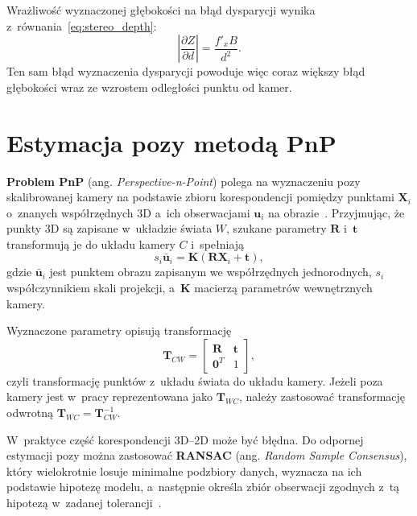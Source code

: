 Wrażliwość wyznaczonej głębokości na błąd dysparycji wynika z~równania~\eqref{eq:stereo_depth}:
\begin{equation}
\left|
\frac{\partial Z}{\partial d}
\right|
=
\frac{f'_x B}{d^2}.
\label{eq:depth_sensitivity}
\end{equation}
Ten sam błąd wyznaczenia dysparycji powoduje więc coraz większy błąd głębokości wraz ze wzrostem odległości punktu od kamer.


\section{Estymacja pozy metodą PnP}
\label{sec:estymacja_pnp}
\label{subsec:pnp}

\textbf{Problem PnP} (ang. \textit{Perspective-n-Point}) polega na wyznaczeniu pozy skalibrowanej kamery na podstawie zbioru korespondencji pomiędzy punktami $\mathbf{X}_i$ o~znanych współrzędnych 3D a~ich obserwacjami $\mathbf{u}_i$ na obrazie~\cite{lepetit2009epnp}. Przyjmując, że punkty 3D są zapisane w~układzie świata $W$, szukane parametry $\mathbf{R}$ i~$\mathbf{t}$ transformują je do układu kamery $C$ i~spełniają
\begin{equation}
s_i\bar{\mathbf{u}}_i
=
\mathbf{K}
\left(
\mathbf{R}\mathbf{X}_i+\mathbf{t}
\right),
\label{eq:pnp}
\end{equation}
gdzie $\bar{\mathbf{u}}_i$ jest punktem obrazu zapisanym we współrzędnych jednorodnych, $s_i$ współczynnikiem skali projekcji, a~$\mathbf{K}$ macierzą parametrów wewnętrznych kamery.

Wyznaczone parametry opisują transformację
\begin{equation}
\mathbf{T}_{CW}
=
\begin{bmatrix}
\mathbf{R} & \mathbf{t} \\
\mathbf{0}^T & 1
\end{bmatrix},
\end{equation}
czyli transformację punktów z~układu świata do układu kamery. Jeżeli poza kamery jest w~pracy reprezentowana jako $\mathbf{T}_{WC}$, należy zastosować transformację odwrotną $\mathbf{T}_{WC}=\mathbf{T}_{CW}^{-1}$.

W~praktyce część korespondencji 3D--2D może być błędna. Do odpornej estymacji pozy można zastosować \textbf{RANSAC} (ang. \textit{Random Sample Consensus}), który wielokrotnie losuje minimalne podzbiory danych, wyznacza na ich podstawie hipotezę modelu, a~następnie określa zbiór obserwacji zgodnych z~tą hipotezą w~zadanej tolerancji~\cite{fischler1981ransac}.

